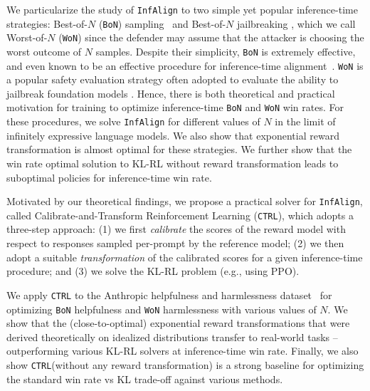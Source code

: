 \documentclass{article}
\newcommand{\iapo}{\texttt{InfAlign}\xspace}
\newcommand{\ctrl}{\texttt{CTRL}\xspace}
\newcommand{\bofn}{\texttt{BoN}\xspace}
\newcommand{\wofn}{\texttt{WoN}\xspace}
\begin{document}
%
%

We particularize the study of \iapo to two simple yet popular inference-time strategies: Best-of-$N$ (\bofn) sampling~\citep{nakano2022webgptbrowserassistedquestionansweringhuman, beirami2024theoretical} and Best-of-$N$ jailbreaking \citep{hughes2024best}, which we call Worst-of-$N$ (\wofn) since the defender may assume that the attacker is choosing the worst outcome of $N$ samples. %
Despite their simplicity, \bofn is extremely effective, and even known to be an effective procedure for inference-time alignment~\citep{beirami2024theoretical, gui2024bonbonalignmentlargelanguage, mudgal2023controlled}.  \wofn is a popular safety evaluation strategy often adopted to evaluate the ability to jailbreak foundation models \citep{yohsua2024international, pair, souly2024strongreject, hughes2024bestofnjailbreaking}. Hence, there is both theoretical and practical motivation for training to optimize inference-time \bofn and \wofn win rates. For these procedures, we solve \iapo for different values of $N$ in the limit of infinitely expressive language models. We also show that exponential reward transformation is almost optimal for these strategies. We further show that the win rate optimal solution to KL-RL without reward transformation leads to suboptimal policies for inference-time win rate.

Motivated by our theoretical findings, we propose a practical solver for \iapo, called Calibrate-and-Transform Reinforcement Learning (\ctrl), which adopts a three-step approach: (1) we first {\it calibrate} the scores of the reward model with respect to responses sampled per-prompt by the reference model; (2) we then adopt a suitable {\it transformation} of the calibrated scores for a given inference-time procedure; and (3) we solve the KL-RL problem (e.g., using PPO).

%


We apply \ctrl to the Anthropic helpfulness and harmlessness dataset~\citep{bai2022training} for optimizing \bofn helpfulness and \wofn harmlessness with various values of $N.$  We show that the (close-to-optimal) exponential reward transformations that were derived theoretically on idealized distributions transfer to real-world tasks -- outperforming various KL-RL solvers at inference-time win rate. Finally, we also show \ctrl (without any reward transformation) is a strong baseline for optimizing the standard win rate vs KL trade-off against various methods.
%
%

%
%
\end{document}
